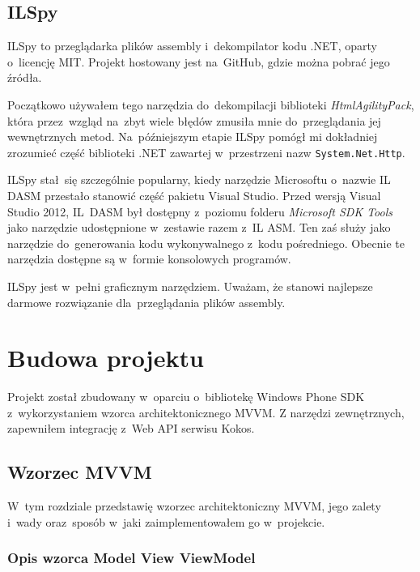\documentclass[a4paper,twoside,titlepage,openright]{book}
\begin{document}
\section{ILSpy}
ILSpy to przeglądarka plików assembly i~dekompilator kodu .NET, oparty o~licencję MIT. Projekt hostowany jest na~GitHub, gdzie można pobrać jego źródła.\cite{ilSpyRepo} 

Początkowo używałem tego narzędzia do~dekompilacji biblioteki \textit{HtmlAgilityPack}, która przez~wzgląd na~zbyt wiele błędów zmusiła mnie do~przeglądania jej wewnętrznych metod. Na~późniejszym etapie ILSpy pomógł mi dokładniej zrozumieć część biblioteki .NET zawartej w~przestrzeni nazw \texttt{System.Net.Http}. 

ILSpy stał~się szczególnie popularny, kiedy narzędzie Microsoftu o~nazwie IL DASM przestało stanowić część pakietu Visual Studio. Przed wersją Visual Studio 2012, IL~DASM był dostępny z~poziomu folderu \textit{Microsoft SDK Tools} jako narzędzie udostępnione w~zestawie razem z~IL ASM. Ten zaś służy jako narzędzie do~generowania kodu wykonywalnego z~kodu pośredniego. Obecnie te narzędzia dostępne są w~formie konsolowych programów. 

ILSpy jest w~pełni graficznym narzędziem. Uważam, że stanowi najlepsze darmowe rozwiązanie dla~przeglądania plików assembly.

 

\chapter{Budowa projektu}
Projekt został zbudowany w~oparciu o~bibliotekę Windows Phone SDK z~wykorzystaniem wzorca architektonicznego MVVM. Z narzędzi zewnętrznych, zapewniłem integrację z~Web API serwisu Kokos.

\section{Wzorzec MVVM}
W~tym rozdziale przedstawię wzorzec architektoniczny MVVM, jego zalety i~wady oraz~sposób w~jaki zaimplementowałem go w~projekcie.

\subsection{Opis wzorca Model View ViewModel}
\end{document}
